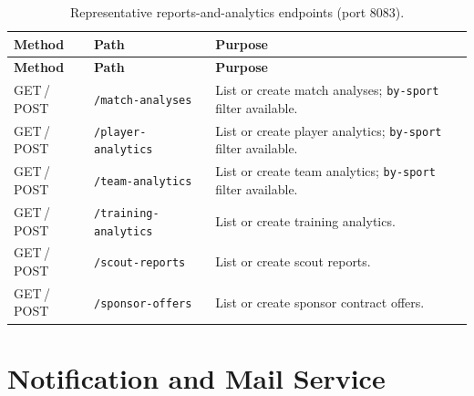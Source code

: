 \begin{longtable}{p{} p{} p{}}
\caption{Representative reports-and-analytics endpoints (port 8083).}
\label{tab:api-reports}\\
\toprule
\textbf{Method} & \textbf{Path} & \textbf{Purpose} \\
\midrule
\endfirsthead
\toprule
\textbf{Method} & \textbf{Path} & \textbf{Purpose} \\
\midrule
\endhead
\bottomrule
\endlastfoot
GET\,/\,POST & \texttt{/match-analyses} & List or create match analyses; \texttt{by-sport} filter available. \\
GET\,/\,POST & \texttt{/player-analytics} & List or create player analytics; \texttt{by-sport} filter available. \\
GET\,/\,POST & \texttt{/team-analytics} & List or create team analytics; \texttt{by-sport} filter available. \\
GET\,/\,POST & \texttt{/training-analytics} & List or create training analytics. \\
GET\,/\,POST & \texttt{/scout-reports} & List or create scout reports. \\
GET\,/\,POST & \texttt{/sponsor-offers} & List or create sponsor contract offers. \\
\end{longtable}

\section{Notification and Mail Service}
\label{app:api-notification}

